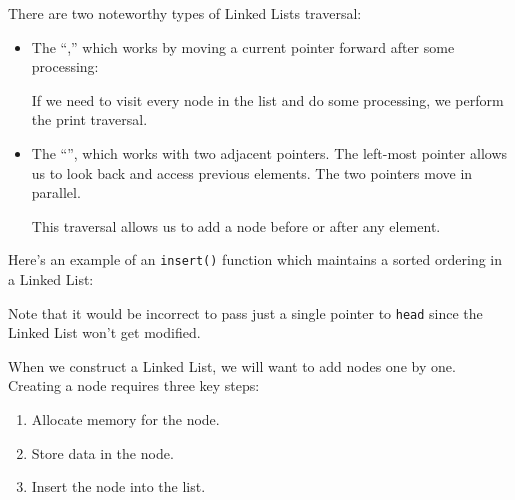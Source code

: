 There are two noteworthy types of Linked Lists traversal: \begin{itemize}
    \item The ``,'' which works by moving a current pointer forward after some processing: 
    
    \lstset{
    caption=Print Traversal}
    \begin{center}
    \label{Print Traversal}
    \end{center}
    
    If we need to visit every node in the list and do some processing, we perform the print traversal.
    
    
    \item The ``'', which works with two adjacent pointers. The left-most pointer allows us to look back and access previous elements. The two pointers move in parallel. 
    
    \lstset{
    caption=Tom and Jerry Traversal}
    \begin{center}
    \label{Tom and Jerry}
    \end{center}

    This traversal allows us to add a node before or after any element. 
\end{itemize}

Here's an example of an \verb!insert()! function which maintains a sorted ordering in a Linked List:



\lstset{
caption=Linked List Insertion}
\begin{center}
\label{Linked List Insertion}
\end{center}

Note that it would be incorrect to pass just a single pointer to \verb!head! since the Linked List won't get modified.



When we construct a Linked List, we will want to add nodes one by one. Creating a node requires three key steps: \begin{enumerate}
    \item Allocate memory for the node.
    \item Store data in the node.
    \item Insert the node into the list.
\end{enumerate}

